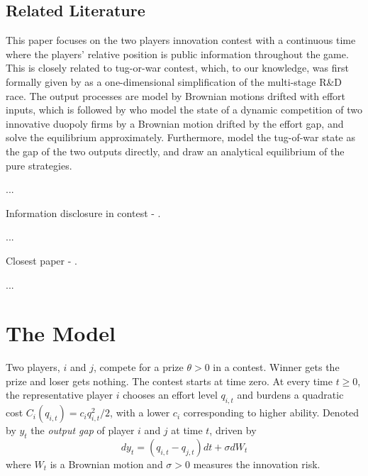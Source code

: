\documentclass[mnsc]{informs3}
\begin{document}
\subsection{Related Literature}

This paper focuses on the two players innovation contest with a continuous time  where the players’ relative position is public information throughout the game.
This is closely related to tug-or-war contest, which, to our knowledge, was first formally given by \citet{Harris1987Race} as a one-dimensional simplification of the multi-stage R\&D race. 
The output processes are model by Brownian motions drifted with effort inputs, which is followed by \cite{budd1993model} who model the state of a dynamic competition of two innovative duopoly firms by a Brownian motion drifted by the effort gap, and solve the equilibrium approximately. 
Furthermore, \citet{Moscarini2011Contest} model the tug-of-war state as the gap of the two outputs directly, and draw an analytical equilibrium of the pure strategies. 

...

Information disclosure in contest - \cite{Bimpikis2019Contest}. 

...

Closest paper - \cite{ryvkin2022fight}.

...




\section{The Model}\label{contest-theory}

Two players, $i$ and $j$, compete for a prize $\theta>0$ in a contest. 
Winner gets the prize and loser gets nothing. 
The contest starts at time zero. 
At every time $t\ge0$, the representative player $i$ chooses an effort level $q_{i,t}$ and burdens a quadratic cost $C_i(q_{i,t}) = c_i q_{i,t}^2/2$, with a lower $c_i$ corresponding to higher ability. 
Denoted by $y_t$ the \textit{output gap} of player $i$ and $j$ at time $t$, driven by
\begin{equation}\label{eq-state-dynamics}
	dy_t = (q_{i,t}-q_{j,t})dt + \sigma dW_t
\end{equation}
where $W_t$ is a Brownian motion and $\sigma>0$ measures the innovation risk.
\end{document}
